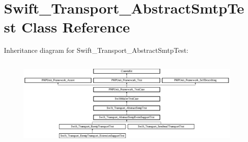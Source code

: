 \section{Swift\+\_\+\+Transport\+\_\+\+Abstract\+Smtp\+Test Class Reference}
\label{class_swift___transport___abstract_smtp_test}
Inheritance diagram for Swift\+\_\+\+Transport\+\_\+\+Abstract\+Smtp\+Test\+:\begin{figure}[H]
\begin{center}
\leavevmode
\includegraphics[height=4.525252cm]{class_swift___transport___abstract_smtp_test}
\end{center}
\end{figure}
